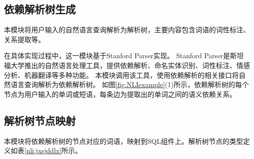
\subsection{依赖解析树生成}
\label{nli:yljxssc}

本模块将用户输入的自然语言查询解析为解析树，主要内容包含词语的词性标注、关系提取等。

在具体实现过程中，这一模块基于Stanford Parser\cite{de2006generating}实现。
Stanford Parser是斯坦福大学推出的自然语言处理工具，提供依赖解析、命名实体识别、词性标注、情感分析、机器翻译等多种功能。
本模块调用该工具，使用依赖解析的相关接口将自然语言查询解析为依赖解析树。
如图\ref{fig:NLIexample}(1)所示，依赖解析树的每个节点为用户输入的单词或短语，每条边为提取出的单词之间的语义依赖关系。

\subsection{解析树节点映射}
\label{nli:jxsjdys}
本模块将依赖解析树的节点对应的词语，映射到SQL组件上。解析树节点的类型定义如表\ref{nli:jxsjddlx}所示。


